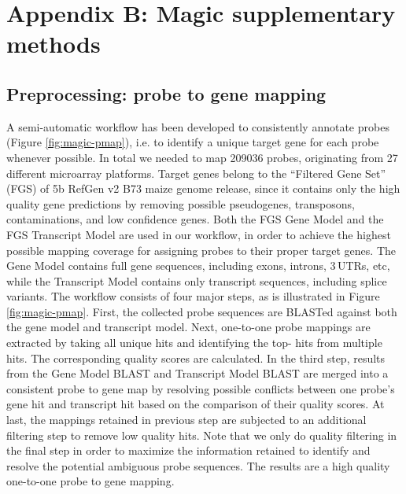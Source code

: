 \chapter{Appendix B: Magic supplementary methods}\label{ch:apd-magic}


\instructionsappendices


\section{Preprocessing: probe to gene mapping}\label{apd:magic-probemap}

A semi-automatic workflow has been developed to consistently annotate probes (Figure \ref{fig:magic-pmap}), i.e. to identify a unique target  gene for each probe whenever possible. In total we needed to map 209036 probes, originating from 27 different microarray platforms. Target genes belong to the “Filtered Gene Set” (FGS) of 5b RefGen v2 B73 maize genome release, since it contains only the high quality gene predictions by removing possible pseudogenes, transposons, contaminations, and low confidence genes. Both the FGS Gene Model and the FGS Transcript Model are used in our workflow, in order to achieve the highest possible mapping coverage for assigning probes to their proper target genes. The Gene Model contains full gene sequences, including exons, introns, 3\textquotesingle\,UTRs, etc, while the Transcript Model  contains only transcript sequences, including splice variants. The workflow consists of four major steps, as is illustrated in Figure \ref{fig:magic-pmap}. First, the collected probe sequences are BLASTed against both the gene model and transcript model. Next, one-to-one probe mappings are extracted by taking all unique hits and identifying the top- hits from multiple hits. The corresponding quality scores are calculated. In the third step, results from the Gene Model BLAST and Transcript Model BLAST are merged into a consistent probe to gene map by resolving possible conflicts between one probe’s gene hit and transcript hit based on the comparison of their quality scores. At last, the mappings retained in previous step are subjected to an additional filtering step to remove low quality hits. Note that we only do quality filtering in the final step in order to maximize the information retained to identify and resolve the potential ambiguous probe sequences. The results are a high quality one-to-one probe to gene mapping.


